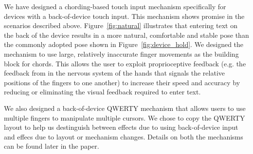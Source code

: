 We have designed a chording-based touch input mechanism specifically
for devices with a back-of-device touch input.  This mechanism shows
promise in the scenarios described above.  Figure~\ref{fig:natural}
illustrates that entering text on the back of the device results in a
more natural, comfortable and stable pose than the commonly adopted
pose shown in Figure~\ref{fig:device_hold}.  We designed the mechanism
to use large, relatively inaccurate finger movements as the building
block for chords.  This allows the user to exploit proprioceptive
feedback (e.g. the feedback from in the nervous system of the hands
that signals the relative positions of the fingers to one another) to
increase their speed and accuracy by reducing or eliminating the
visual feedback required to enter text. 

We also designed a back-of-device QWERTY mechanism that allows users
to use multiple fingers to manipulate multiple cursors.  We chose to
copy the QWERTY layout to help us destinguish between effects due to
using back-of-device input and effecs due to layout or mechanism
changes. Details on both the mechanisms can be found later in the
paper.

